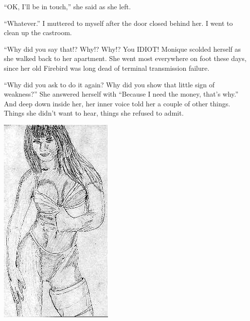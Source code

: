 ``OK, I'll be in touch,'' she said as she left.

``Whatever.'' I muttered to myself after the door closed behind her. I went to clean up the
castroom.

\begin{thought}
``Why did you say that!? Why!? Why!? You IDIOT! Monique scolded herself as she walked back
to her apartment. She went most everywhere on foot these days, since her old Firebird was long
dead of terminal transmission failure.

``Why did you ask to do it again? Why did you show that little sign of weakness?'' She
answered herself with ``Because I need the money, that's why.'' And deep down inside her, her
inner voice told her a couple of other things. Things she didn't want to hear, things she
refused to admit.
\end{thought}

\newpage
\begin{center}
\includegraphics{images/kicks08.jpg}
\end{center}
